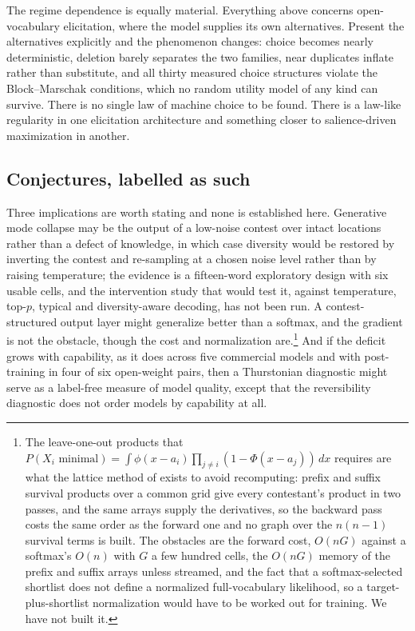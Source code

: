 \documentclass[11pt]{article}
\begin{document}
The regime dependence is equally material. Everything above concerns
open-vocabulary elicitation, where the model supplies its own alternatives.
Present the alternatives explicitly and the phenomenon changes: choice becomes
nearly deterministic, deletion barely separates the two families, near
duplicates inflate rather than substitute, and all thirty measured choice
structures violate the Block--Marschak conditions, which no random utility model
of any kind can survive. There is no single law of machine choice to be found.
There is a law-like regularity in one elicitation architecture and something
closer to salience-driven maximization in another.

\subsection*{Conjectures, labelled as such}

Three implications are worth stating and none is established here. Generative
mode collapse may be the output of a low-noise contest over intact locations
rather than a defect of knowledge, in which case diversity would be restored by
inverting the contest and re-sampling at a chosen noise level rather than by
raising temperature; the evidence is a fifteen-word exploratory design with six
usable cells, and the intervention study that would test it, against
temperature, top-$p$, typical and diversity-aware decoding, has not been run. A
contest-structured output layer might generalize better than a softmax, and the
gradient is not the obstacle, though the cost and normalization are.\footnote{The
leave-one-out products that $P(X_i \text{ minimal}) = \int \phi(x-a_i)
\prod_{j \neq i}(1-\Phi(x-a_j))\,dx$ requires are what the lattice method of
\cite{cotton2021} exists to avoid recomputing: prefix and suffix survival
products over a common grid give every contestant's product in two passes, and
the same arrays supply the derivatives, so the backward pass costs the same order
as the forward one and no graph over the $n(n-1)$ survival terms is built. The
obstacles are the forward cost, $O(nG)$ against a softmax's $O(n)$ with $G$ a few
hundred cells, the $O(nG)$ memory of the prefix and suffix arrays unless
streamed, and the fact that a softmax-selected shortlist does not define a
normalized full-vocabulary likelihood, so a target-plus-shortlist normalization
would have to be worked out for training. We have not built it.} And if the
deficit grows with capability, as it does across five commercial models and with
post-training in four of six open-weight pairs, then a Thurstonian diagnostic
might serve as a label-free measure of model quality, except that the
reversibility diagnostic does not order models by capability at all.
\end{document}
